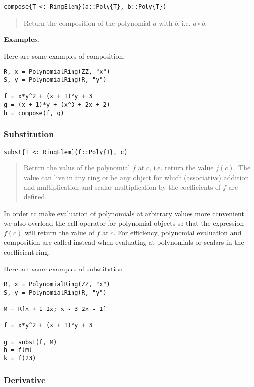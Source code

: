 \documentclass[a4paper,10pt]{article}
\newcommand{\desc}[1]{\vspace{-3mm}\begin{quote}#1\end{quote}}
\begin{document}
\begin{lstlisting}
compose{T <: RingElem}(a::Poly{T}, b::Poly{T})
\end{lstlisting}

\desc{Return the composition of the polynomial $a$ with $b$, i.e. $a \circ b$.}

\textbf{Examples.}

Here are some examples of composition.

\begin{lstlisting}
R, x = PolynomialRing(ZZ, "x")
S, y = PolynomialRing(R, "y")

f = x*y^2 + (x + 1)*y + 3
g = (x + 1)*y + (x^3 + 2x + 2)
h = compose(f, g)
\end{lstlisting}

\subsubsection{Substitution}

\begin{lstlisting}
subst{T <: RingElem}(f::Poly{T}, c)
\end{lstlisting}

\desc{Return the value of the polynomial $f$ at $c$, i.e. return the value
$f(c)$. The value can live in any ring or be any object for which (associative)
addition and multiplication and scalar multiplication by the coefficients of
$f$ are defined.}

In order to make evaluation of polynomials at arbitrary values more convenient
we also overload the call operator for polynomial objects so that the
expression $f(c)$ will return the value of $f$ at $c$. For efficiency,
polynomial evaluation and composition are called instead when evaluating at
polynomials or scalars in the coefficient ring.

Here are some examples of substitution.

\begin{lstlisting}
R, x = PolynomialRing(ZZ, "x")
S, y = PolynomialRing(R, "y")

M = R[x + 1 2x; x - 3 2x - 1]

f = x*y^2 + (x + 1)*y + 3

g = subst(f, M)
h = f(M)
k = f(23)
\end{lstlisting}

\subsubsection{Derivative}
\end{document}
